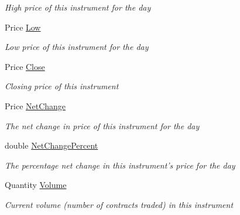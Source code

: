 \begin{DoxyCompactItemize}
\begin{DoxyCompactList}\small\item\em High price of this instrument for the day \end{DoxyCompactList}\item 
Price \hyperlink{class_e_z_a_p_i_1_1_containers_1_1_t_t_instrument_a945159611455e9a10710b8b20235ac8d}{Low}
\begin{DoxyCompactList}\small\item\em Low price of this instrument for the day \end{DoxyCompactList}\item 
Price \hyperlink{class_e_z_a_p_i_1_1_containers_1_1_t_t_instrument_acabb0a759b2015272ed8e8c33364aba0}{Close}
\begin{DoxyCompactList}\small\item\em Closing price of this instrument \end{DoxyCompactList}\item 
Price \hyperlink{class_e_z_a_p_i_1_1_containers_1_1_t_t_instrument_aa603e1f65e403735c026065d28669292}{Net\-Change}
\begin{DoxyCompactList}\small\item\em The net change in price of this instrument for the day \end{DoxyCompactList}\item 
double \hyperlink{class_e_z_a_p_i_1_1_containers_1_1_t_t_instrument_afe80f04bedf1e51d1983bc81798fae80}{Net\-Change\-Percent}
\begin{DoxyCompactList}\small\item\em The percentage net change in this instrument's price for the day \end{DoxyCompactList}\item 
Quantity \hyperlink{class_e_z_a_p_i_1_1_containers_1_1_t_t_instrument_a70c62e99148ab0ddf115649e1610daa8}{Volume}
\begin{DoxyCompactList}\small\item\em Current volume (number of contracts traded) in this instrument \end{DoxyCompactList}\item 

\end{DoxyCompactItemize}
